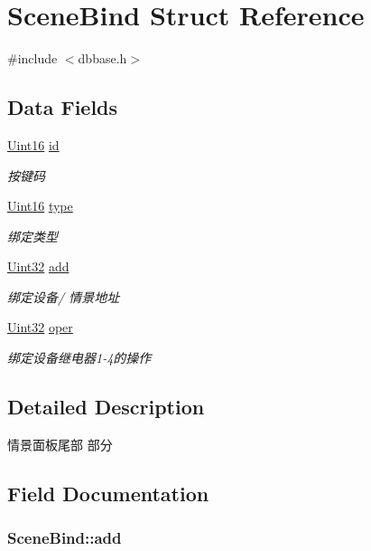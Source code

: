 \hypertarget{structSceneBind}{\section{Scene\-Bind Struct Reference}
\label{structSceneBind}
}


{\ttfamily \#include $<$dbbase.\-h$>$}

\subsection*{Data Fields}
\begin{DoxyCompactItemize}
\item 
\hyperlink{base_8h_ae9f2e1f80fbd243687a04febbf590e13}{Uint16} \hyperlink{structSceneBind_a92e50caa085d61d80804f44eef26c240}{id}
\begin{DoxyCompactList}\small\item\em 按键码 \end{DoxyCompactList}\item 
\hyperlink{base_8h_ae9f2e1f80fbd243687a04febbf590e13}{Uint16} \hyperlink{structSceneBind_a3d49ad98d2ccb1be6cf4f55be61b0390}{type}
\begin{DoxyCompactList}\small\item\em 绑定类型 \end{DoxyCompactList}\item 
\hyperlink{base_8h_a60cf7b3c038ce37a50796e8eaddf0b5f}{Uint32} \hyperlink{structSceneBind_aa2d7e582a6ef1f73b685bd86a3a83ab2}{add}
\begin{DoxyCompactList}\small\item\em 绑定设备/ 情景地址 \end{DoxyCompactList}\item 
\hyperlink{base_8h_a60cf7b3c038ce37a50796e8eaddf0b5f}{Uint32} \hyperlink{structSceneBind_abf48651d36a041e163a0c1ecac190288}{oper}
\begin{DoxyCompactList}\small\item\em 绑定设备继电器1-\/4的操作 \end{DoxyCompactList}\end{DoxyCompactItemize}


\subsection{Detailed Description}
情景面板尾部 部分 

\subsection{Field Documentation}
\hypertarget{structSceneBind_aa2d7e582a6ef1f73b685bd86a3a83ab2}{
\subsubsection[{add}]{ Scene\-Bind\-::add}}\label{structSceneBind_aa2d7e582a6ef1f73b685bd86a3a83ab2}



